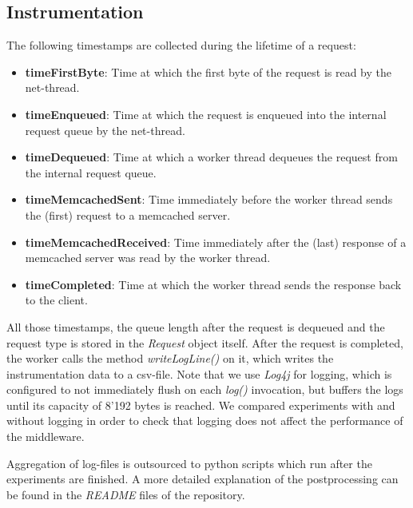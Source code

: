\subsection{Instrumentation} \label{sub:instr}
The following timestamps are collected during the lifetime of a request:
\begin{itemize}
    \item \textbf{timeFirstByte}: Time at which the first byte of the request is read by the net-thread.
    \item \textbf{timeEnqueued}: Time at which the request is enqueued into the internal request queue by the net-thread. 
    \item \textbf{timeDequeued}: Time at which a worker thread dequeues the request from the internal request queue.
    \item \textbf{timeMemcachedSent}: Time immediately before the worker thread sends the (first) request to a memcached server. 
    \item \textbf{timeMemcachedReceived}: Time immediately after the (last) response of a memcached server was read by the worker thread. 
    \item \textbf{timeCompleted}: Time at which the worker thread sends the response back to the client. 
\end{itemize}
All those timestamps, the queue length after the request is dequeued and the request type is stored in the \textit{Request} object itself. After the request is completed, the worker calls the method \textit{writeLogLine()} on it, which writes the instrumentation data to a csv-file. Note that we use \textit{Log4j} for logging, which is configured to not immediately flush on each \textit{log()} invocation, but buffers the logs until its capacity of 8'192 bytes is reached. We compared experiments with and without logging in order to check that logging does not affect the performance of the middleware. 

Aggregation of log-files is outsourced to python scripts which run after the experiments are finished. A more detailed explanation of the postprocessing can be found in the \textit{README} files of the repository.
